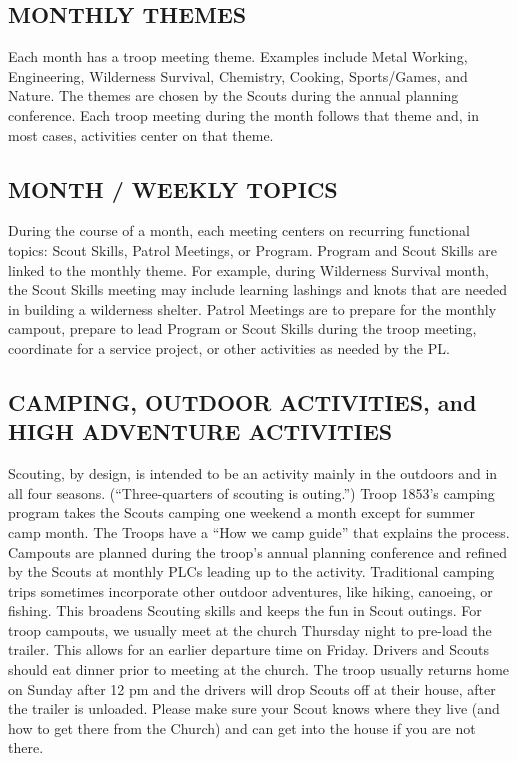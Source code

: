 \documentclass{ltxguide}
\begin{document}
\subsection{MONTHLY THEMES}
Each month has a troop meeting theme. Examples include Metal Working, Engineering, Wilderness Survival, Chemistry, Cooking, Sports/Games, and Nature. The themes are chosen by the Scouts during the annual planning conference. Each troop meeting during the month follows that theme and, in most cases, activities center on that theme.

\subsection{MONTH / WEEKLY TOPICS}
During the course of a month, each meeting centers on recurring functional topics: Scout Skills, Patrol Meetings, or Program. Program and Scout Skills are linked to the monthly theme. For example, during Wilderness Survival month, the Scout Skills meeting may include learning lashings and knots that are needed in building a wilderness shelter. Patrol Meetings are to prepare for the monthly campout, prepare to lead Program or Scout Skills during the troop meeting, coordinate for a service project, or other activities as needed by the \ac{PL}.

\subsection{CAMPING, OUTDOOR ACTIVITIES, and HIGH ADVENTURE ACTIVITIES}
Scouting, by design, is intended to be an activity mainly in the outdoors and in all four seasons. (“Three-quarters of scouting is outing.”) Troop 1853's camping program takes the Scouts camping one weekend a month except for summer camp month. 
The Troops have a “How we camp guide” that explains the process. 
Campouts are planned during the troop's annual planning conference and refined by the Scouts at monthly \acp{PLC} leading up to the activity. Traditional camping trips sometimes incorporate other outdoor adventures, like hiking, canoeing, or fishing. This broadens Scouting skills and keeps the fun in Scout outings. For troop campouts, we usually meet at the church Thursday night to pre-load the trailer. This allows for an earlier departure time on Friday. Drivers and Scouts should eat dinner prior to meeting at the  church. The troop usually returns home on Sunday after 12 pm and the drivers will drop Scouts    off at their house, after the trailer is unloaded. Please make sure your Scout knows where they live (and how to get there from the Church) and can get into the house if you are not there.
\end{document}
